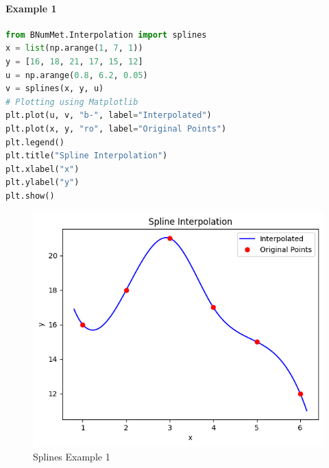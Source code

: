 \paragraph{Example 1}{
\begin{lstlisting}[language=Python]
from BNumMet.Interpolation import splines
x = list(np.arange(1, 7, 1))
y = [16, 18, 21, 17, 15, 12]
u = np.arange(0.8, 6.2, 0.05)
v = splines(x, y, u)
# Plotting using Matplotlib
plt.plot(u, v, "b-", label="Interpolated")
plt.plot(x, y, "ro", label="Original Points")
plt.legend()
plt.title("Spline Interpolation")
plt.xlabel("x")
plt.ylabel("y")
plt.show()
\end{lstlisting}
\begin{figure}[H]
    \centering
    \includegraphics{Include/Images/Thesis/Documentation/Interpolation/Splines Example 1.png}
    \caption{Splines Example 1}
    \label{fig:Splines Example 1}
\end{figure}

}